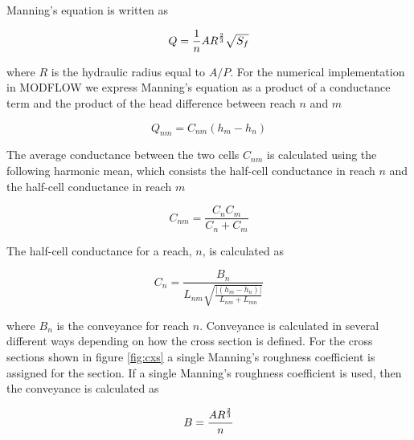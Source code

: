 \documentclass[fleqn]{article}
\begin{document}
Manning's equation is written as

\begin{equation}
  Q = \frac{1}{n} A R^{2 \over 3} \sqrt{S_f}
\end{equation}

\noindent where $R$ is the hydraulic radius equal to $A / P$.  For the numerical implementation in MODFLOW we express Manning's equation as a product of a conductance term and the product of the head difference between reach $n$ and $m$

\begin{equation}
  Q_{nm} = C_{nm} \left ( h_m - h_n \right )
\end{equation}

\noindent The average conductance between the two cells $C_{nm}$ is calculated using the following harmonic mean, which consists the half-cell conductance in reach $n$ and the half-cell conductance in reach $m$

\begin{equation}
  C_{nm} = \frac{C_n  C_m}{C_n + C_m}
\end{equation}

The half-cell conductance for a reach, $n$, is calculated as

\begin{equation}
  C_n = \frac{B_n}{ L_{nm} \sqrt{ \frac{ | \left ( h_m - h_n \right ) | } {L_{nm} + L_{mn}}} }
\end{equation}

\noindent where $B_n$ is the conveyance for reach $n$.  Conveyance is calculated in several different ways depending on how the cross section is defined.  For the cross sections shown in figure \ref{fig:cxs} a single Manning's roughness coefficient is assigned for the section.  If a single Manning's roughness coefficient is used, then the conveyance is calculated as

\begin{equation}
  B = \frac{A R^{2 \over 3}}{n}
\end{equation}
\end{document}
